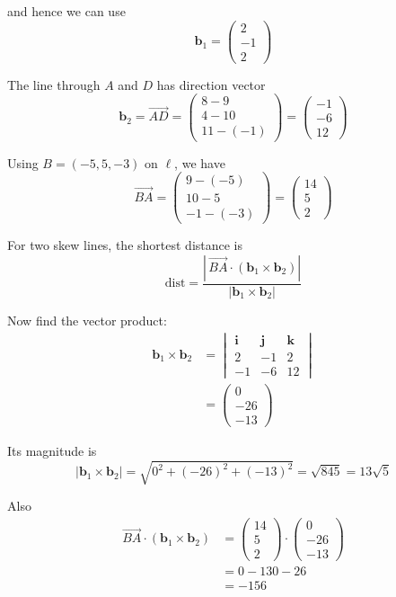 \documentclass[leqno]{article}
\begin{document}
\begin{enumerate}[
  label=\textbf{\arabic*.},
  leftmargin=*,
  topsep=0pt,
  partopsep=0pt,
  parsep=0pt
]
\begin{djsSolution}
\begin{enumerate}[label=\textbf{(\alph*)}]
and hence we can use
\[
\mathbf b_1=\begin{pmatrix}2\\-1\\2\end{pmatrix}
\]

The line through $A$ and $D$ has direction vector
\[
\mathbf b_2=\overrightarrow{AD}=\begin{pmatrix}8-9\\4-10\\11-(-1)\end{pmatrix}=\begin{pmatrix}-1\\-6\\12\end{pmatrix}
\]

Using $B=(-5,5,-3)$ on $\ell$, we have
\[
\overrightarrow{BA}=\begin{pmatrix}9-(-5)\\10-5\\-1-(-3)\end{pmatrix}=\begin{pmatrix}14\\5\\2\end{pmatrix}
\]

For two skew lines, the shortest distance is
\[
\mathrm{dist}=
\frac{\left|\,\overrightarrow{BA}\cdot(\mathbf b_1\times \mathbf b_2)\right|}{|\mathbf b_1\times \mathbf b_2|}
\]

Now find the vector product:
\begin{align*}
\mathbf b_1\times \mathbf b_2
&=
\begin{vmatrix}
\mathbf i & \mathbf j & \mathbf k\\
2 & -1 & 2\\
-1 & -6 & 12
\end{vmatrix}\\
&=\begin{pmatrix}0\\-26\\-13\end{pmatrix}
\end{align*}

Its magnitude is
\[
|\mathbf b_1\times \mathbf b_2|
=\sqrt{0^2+(-26)^2+(-13)^2}
=\sqrt{845}
=13\sqrt5
\]

Also
\begin{align*}
\overrightarrow{BA}\cdot(\mathbf b_1\times \mathbf b_2)
&=\begin{pmatrix}14\\5\\2\end{pmatrix}\cdot\begin{pmatrix}0\\-26\\-13\end{pmatrix}\\
&=0-130-26\\
&=-156
\end{align*}


\end{enumerate}
\end{djsSolution}
\end{enumerate}
\end{document}
